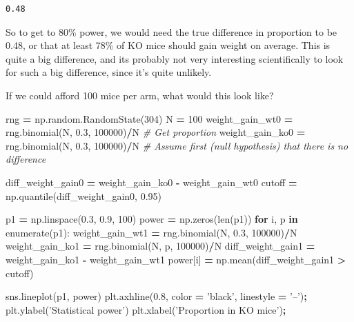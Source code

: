 \documentclass[
  letterpaper,
]{scrbook}
\newenvironment{Shaded}{\begin{snugshade}}{\end{snugshade}}
\newcommand{\BuiltInTok}[1]{#1}
\newcommand{\CommentTok}[1]{\textcolor[rgb]{0.56,0.35,0.01}{\textit{#1}}}
\newcommand{\ControlFlowTok}[1]{\textcolor[rgb]{0.13,0.29,0.53}{\textbf{#1}}}
\newcommand{\DecValTok}[1]{\textcolor[rgb]{0.00,0.00,0.81}{#1}}
\newcommand{\FloatTok}[1]{\textcolor[rgb]{0.00,0.00,0.81}{#1}}
\newcommand{\KeywordTok}[1]{\textcolor[rgb]{0.13,0.29,0.53}{\textbf{#1}}}
\newcommand{\NormalTok}[1]{#1}
\newcommand{\OperatorTok}[1]{\textcolor[rgb]{0.81,0.36,0.00}{\textbf{#1}}}
\newcommand{\StringTok}[1]{\textcolor[rgb]{0.31,0.60,0.02}{#1}}
\begin{document}
\begin{verbatim}
0.48
\end{verbatim}

So to get to 80\% power, we would need the true difference in proportion to be 0.48, or that at least 78\% of KO mice should gain weight on average. This is quite a big difference, and its probably not very interesting scientifically to look for such a big difference, since it's quite unlikely.

If we could afford 100 mice per arm, what would this look like?

\begin{Shaded}
\begin{Highlighting}[]
\NormalTok{rng }\OperatorTok{=}\NormalTok{ np.random.RandomState(}\DecValTok{304}\NormalTok{)}
\NormalTok{N }\OperatorTok{=} \DecValTok{100}
\NormalTok{weight_gain_wt0 }\OperatorTok{=}\NormalTok{ rng.binomial(N, }\FloatTok{0.3}\NormalTok{, }\DecValTok{100000}\NormalTok{)}\OperatorTok{/}\NormalTok{N }\CommentTok{# Get proportion}
\NormalTok{weight_gain_ko0 }\OperatorTok{=}\NormalTok{ rng.binomial(N, }\FloatTok{0.3}\NormalTok{, }\DecValTok{100000}\NormalTok{)}\OperatorTok{/}\NormalTok{N }\CommentTok{# Assume first (null hypothesis) that there is no difference}

\NormalTok{diff_weight_gain0 }\OperatorTok{=}\NormalTok{ weight_gain_ko0 }\OperatorTok{-}\NormalTok{ weight_gain_wt0}
\NormalTok{cutoff }\OperatorTok{=}\NormalTok{ np.quantile(diff_weight_gain0, }\FloatTok{0.95}\NormalTok{)}

\NormalTok{p1 }\OperatorTok{=}\NormalTok{ np.linspace(}\FloatTok{0.3}\NormalTok{, }\FloatTok{0.9}\NormalTok{, }\DecValTok{100}\NormalTok{)}
\NormalTok{power }\OperatorTok{=}\NormalTok{ np.zeros(}\BuiltInTok{len}\NormalTok{(p1))}
\ControlFlowTok{for}\NormalTok{ i, p }\KeywordTok{in} \BuiltInTok{enumerate}\NormalTok{(p1):}
\NormalTok{    weight_gain_wt1 }\OperatorTok{=}\NormalTok{ rng.binomial(N, }\FloatTok{0.3}\NormalTok{, }\DecValTok{100000}\NormalTok{)}\OperatorTok{/}\NormalTok{N}
\NormalTok{    weight_gain_ko1 }\OperatorTok{=}\NormalTok{ rng.binomial(N, p, }\DecValTok{100000}\NormalTok{)}\OperatorTok{/}\NormalTok{N}
\NormalTok{    diff_weight_gain1 }\OperatorTok{=}\NormalTok{ weight_gain_ko1 }\OperatorTok{-}\NormalTok{ weight_gain_wt1}
\NormalTok{    power[i] }\OperatorTok{=}\NormalTok{ np.mean(diff_weight_gain1 }\OperatorTok{>}\NormalTok{ cutoff)}

\NormalTok{sns.lineplot(p1, power)}
\NormalTok{plt.axhline(}\FloatTok{0.8}\NormalTok{, color }\OperatorTok{=} \StringTok{'black'}\NormalTok{, linestyle }\OperatorTok{=} \StringTok{'--'}\NormalTok{)}\OperatorTok{;}
\NormalTok{plt.ylabel(}\StringTok{'Statistical power'}\NormalTok{)}
\NormalTok{plt.xlabel(}\StringTok{'Proportion in KO mice'}\NormalTok{)}\OperatorTok{;}
\end{Highlighting}
\end{Shaded}
\end{document}
